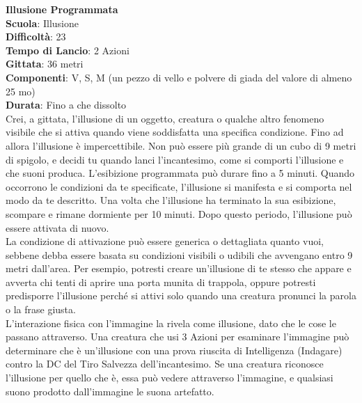 \begin{multicols}{2}
\medskip\textbf{Illusione Programmata}\\
\textbf{Scuola}: Illusione\\
\textbf{Difficoltà}:  23\\
\textbf{Tempo di Lancio}: 2 Azioni\\
\textbf{Gittata}: 36 metri\\
\textbf{Componenti}: V, S, M (un pezzo di vello e polvere di giada del valore di almeno 25 mo)\\
\textbf{Durata}: Fino a che dissolto\\
Crei, a gittata, l’illusione di un oggetto, creatura o qualche altro fenomeno visibile che si attiva quando viene soddisfatta una specifica condizione. Fino ad allora l’illusione è impercettibile. Non può essere più grande di un cubo di 9 metri di spigolo, e decidi tu quando lanci l'incantesimo, come si comporti l’illusione e che suoni produca. L’esibizione programmata può durare fino a 5 minuti. Quando occorrono le condizioni da te specificate, l’illusione si manifesta e si comporta nel modo da te descritto. Una volta che l’illusione ha terminato la sua esibizione, scompare e rimane dormiente per 10 minuti. Dopo questo periodo, l’illusione può essere attivata di nuovo.\\
La condizione di attivazione può essere generica o dettagliata quanto vuoi, sebbene debba essere basata su condizioni visibili o udibili che avvengano entro 9 metri dall'area. Per esempio, potresti creare un'illusione di te stesso che appare e avverta chi tenti di aprire una porta munita di trappola, oppure potresti predisporre l’illusione perché si attivi solo quando una creatura pronunci la parola o la frase giusta.\\
L’interazione fisica con l’immagine la rivela come illusione, dato che le cose le passano attraverso. Una creatura che usi 3 Azioni per esaminare l’immagine può determinare che è un'illusione con una prova riuscita di Intelligenza (Indagare) contro la DC del Tiro Salvezza dell'incantesimo. Se una creatura riconosce l’illusione per quello che è, essa può vedere attraverso l’immagine, e qualsiasi suono prodotto dall'immagine le suona artefatto.


\end{multicols}
